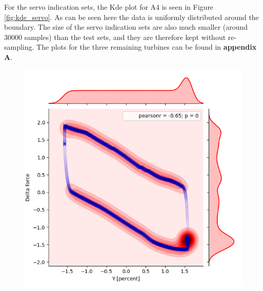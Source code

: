             For the servo indication sets, the Kde plot for A4 is seen in Figure \ref{fig:kde_servo}. As can be seen here the data is uniformly distributed around the boundary. The size of the servo indication sets are also much smaller (around $30000$ samples) than the test sets, and they are therefore kept without re-sampling. The plots for the three remaining turbines can be found in \textbf{appendix A}.  
            
            \begin{figure}[h]
                \begin{minipage}[b]{0.5\linewidth}
                    \includegraphics[width=1\linewidth]{figures/data/kdePlot_servoindication_A4.png} 
                \end{minipage}
                  \hfill
                  \begin{minipage}[b]{0.5\linewidth}

\end{minipage}
\end{figure}
